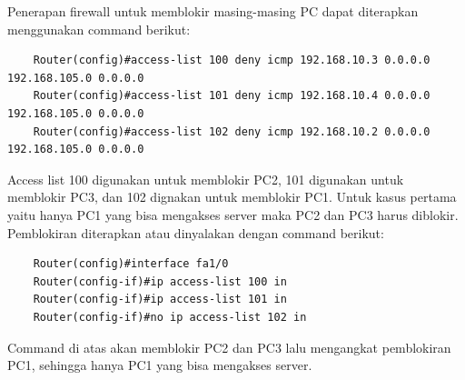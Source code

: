 Penerapan firewall untuk memblokir masing-masing PC dapat diterapkan menggunakan command berikut:
\begin{lstlisting}
	Router(config)#access-list 100 deny icmp 192.168.10.3 0.0.0.0 192.168.105.0 0.0.0.0
	Router(config)#access-list 101 deny icmp 192.168.10.4 0.0.0.0 192.168.105.0 0.0.0.0
	Router(config)#access-list 102 deny icmp 192.168.10.2 0.0.0.0 192.168.105.0 0.0.0.0
\end{lstlisting}
Access list 100 digunakan untuk memblokir PC2, 101 digunakan untuk memblokir PC3, dan 102 dignakan untuk memblokir PC1. Untuk kasus pertama yaitu hanya PC1 yang bisa mengakses server maka PC2 dan PC3 harus diblokir. Pemblokiran diterapkan atau dinyalakan dengan command berikut:
\begin{lstlisting}
	Router(config)#interface fa1/0
	Router(config-if)#ip access-list 100 in
	Router(config-if)#ip access-list 101 in
	Router(config-if)#no ip access-list 102 in
\end{lstlisting}
Command di atas akan memblokir PC2 dan PC3 lalu mengangkat pemblokiran PC1, sehingga hanya PC1 yang bisa mengakses server. 
